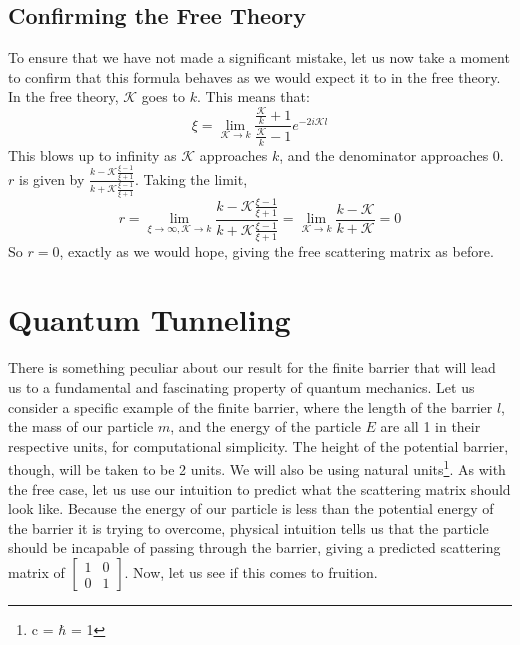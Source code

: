 \documentclass{report}
\begin{document}
\subsection{Confirming the Free Theory}
To ensure that we have not made a significant mistake, let us now take a moment to confirm that this formula behaves as we would expect it to in the free theory. In the free theory, $\mathcal{K}$ goes to $k$. This means that:
\[
\xi = \lim_{\mathcal{K} \to k} \frac{\frac{\mathcal{K}}{k} + 1}{\frac{\mathcal{K}}{k} - 1}e^{-2i\mathcal{K}l}
\]
This blows up to infinity as $\mathcal{K}$ approaches $k$, and the denominator approaches 0. $r$ is given by $\frac{k - \mathcal{K}\frac{\xi - 1}{\xi + 1}}{k + \mathcal{K}\frac{\xi - 1}{\xi + 1}}$. Taking the limit,
\[
r = \lim_{\xi \to \infty, \mathcal{K} \to k} \frac{k - \mathcal{K}\frac{\xi - 1}{\xi + 1}}{k + \mathcal{K}\frac{\xi - 1}{\xi + 1}} = \lim_{\mathcal{K} \to k} \frac{k - \mathcal{K}}{k + \mathcal{K}} = 0
\]
So $r=0$, exactly as we would hope, giving the free scattering matrix as before.

\section{Quantum Tunneling}
There is something peculiar about our result for the finite barrier that will lead us to a fundamental and fascinating property of quantum mechanics. Let us consider a specific example of the finite barrier, where the length of the barrier $l$, the mass of our particle $m$, and the energy of the particle $E$ are all 1 in their respective units, for computational simplicity. The height of the potential barrier, though, will be taken to be 2 units. We will also be using natural units\footnote{c = $\hbar$ = 1}. As with the free case, let us use our intuition to predict what the scattering matrix should look like. Because the energy of our particle is less than the potential energy of the barrier it is trying to overcome, physical intuition tells us that the particle should be incapable of passing through the barrier, giving a predicted scattering matrix of $\begin{bmatrix} 1 & 0 \\ 0 & 1 \end{bmatrix}$. Now, let us see if this comes to fruition.
\end{document}
